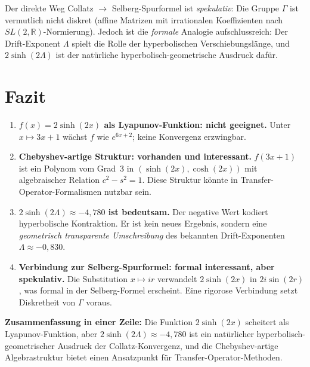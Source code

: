 \documentclass[12pt,a4paper]{article}
\newcommand{\sinh}{\operatorname{sinh}}
\renewcommand{\cosh}{\operatorname{cosh}}
\newcommand{\R}{\mathbb{R}}
\begin{document}
Der direkte Weg Collatz $\to$ Selberg-Spurformel ist \emph{spekulativ}:
Die Gruppe $\Gamma$ ist vermutlich nicht diskret (affine Matrizen mit
irrationalen Koeffizienten nach $SL(2,\R)$-Normierung).
Jedoch ist die \emph{formale} Analogie aufschlussreich:
Der Drift-Exponent $\Lambda$ spielt die Rolle der hyperbolischen Verschiebungslänge,
und $2\sinh(2\Lambda)$ ist der natürliche hyperbolisch-geometrische Ausdruck dafür.

\section{Fazit}

\begin{tcolorbox}[fazit]
\begin{enumerate}[label=\textbf{\arabic*.}]
  \item \textbf{$f(x) = 2\sinh(2x)$ als Lyapunov-Funktion: nicht geeignet.}
        Unter $x \mapsto 3x+1$ wächst $f$ wie $e^{6x+2}$; keine Konvergenz erzwingbar.

  \item \textbf{Chebyshev-artige Struktur: vorhanden und interessant.}
        $f(3x+1)$ ist ein Polynom vom Grad~3 in $(\sinh(2x), \cosh(2x))$
        mit algebraischer Relation $c^2 - s^2 = 1$.
        Diese Struktur könnte in Transfer-Operator-Formalismen nutzbar sein.

  \item \textbf{$2\sinh(2\Lambda) \approx -4{,}780$ ist bedeutsam.}
        Der negative Wert kodiert hyperbolische Kontraktion.
        Er ist kein neues Ergebnis, sondern eine \emph{geometrisch transparente
        Umschreibung} des bekannten Drift-Exponenten $\Lambda \approx -0{,}830$.

  \item \textbf{Verbindung zur Selberg-Spurformel: formal interessant, aber spekulativ.}
        Die Substitution $x \mapsto ir$ verwandelt $2\sinh(2x)$ in $2i\sin(2r)$,
        was formal in der Selberg-Formel erscheint. Eine rigorose Verbindung
        setzt Diskretheit von $\Gamma$ voraus.
\end{enumerate}
\end{tcolorbox}

\bigskip

\noindent\textbf{Zusammenfassung in einer Zeile:}
Die Funktion $2\sinh(2x)$ scheitert als Lyapunov-Funktion,
aber $2\sinh(2\Lambda) \approx -4{,}780$ ist ein natürlicher
hyperbolisch-geometrischer Ausdruck der Collatz-Konvergenz,
und die Chebyshev-artige Algebrastruktur bietet einen Ansatzpunkt
für Transfer-Operator-Methoden.
\end{document}
